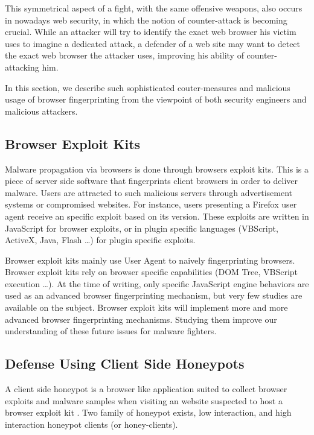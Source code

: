 \documentclass[10pt]{IEEEtran}
\begin{document}
This symmetrical aspect of a fight, with the same offensive weapons, also occurs
in nowadays web security, in which the notion of counter-attack is becoming
crucial. While an attacker will try to identify the exact web browser his
victim uses to imagine a dedicated attack, a defender of a web site may want
to detect the exact web browser the attacker uses, improving his ability of
counter-attacking him.




In this section, we describe such sophisticated couter-measures and malicious usage 
of browser fingerprinting
from the viewpoint of both security engineers and malicious attackers.




\subsection{Browser Exploit Kits}
Malware propagation via browsers is done through browsers exploit kits. This is 
a piece of server side software that fingerprints client browsers in order to 
deliver malware. 
Users are attracted to such malicious servers through advertisement systems or 
compromised websites. 
For instance, users presenting a Firefox user agent receive an specific 
exploit based on its version.
These exploits are written in JavaScript for browser exploits, or in plugin 
specific languages (VBScript, ActiveX, Java, Flash \ldots) for plugin specific 
exploits.




Browser exploit kits mainly use User Agent to naively fingerprinting 
browsers.
Browser exploit kits rely on browser specific capabilities (DOM Tree, VBScript
execution \ldots).
At the time of writing, only specific JavaScript engine behaviors 
\cite{egele2009defending} are used as an advanced browser fingerprinting 
mechanism, but very few studies are available on the subject.
Browser exploit kits will implement more and more advanced browser fingerprinting 
mechanisms. Studying them improve our understanding of these future issues for malware fighters.








\subsection{Defense Using Client Side Honeypots}
A client side honeypot is a browser like application suited to collect 
browser exploits and malware samples when visiting an website suspected to host 
a browser exploit kit \cite{provos2004virtual}. Two family of honeypot exists, 
low interaction, and high
interaction honeypot clients (or honey-clients).
\end{document}
